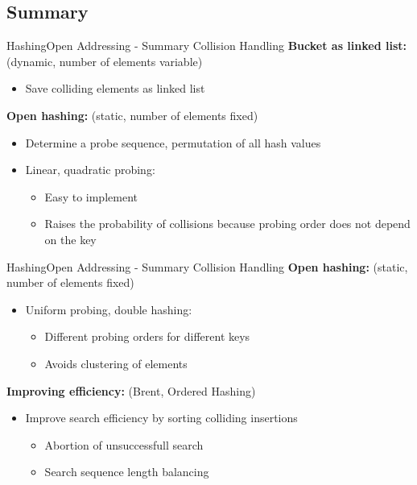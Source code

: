 
\subsection{Summary}

\begin{frame}{Hashing}{Open Addressing - Summary Collision Handling}
  \textbf{Bucket as linked list:}
  {\color{MainA}(dynamic, number of elements variable)}
  \begin{itemize}
    \item
      Save colliding elements as linked list
  \end{itemize}
  \vspace{1.0em}
  \textbf{Open hashing:}
  {\color{MainA}(static, number of elements fixed)}
  \begin{itemize}
    \item
      Determine a probe sequence, permutation of all hash values
    \item
      Linear, quadratic probing:
      \begin{itemize}
        \item
          Easy to implement
        \item
          Raises the probability of collisions because probing order does
          not depend on the key
      \end{itemize}
  \end{itemize}
\end{frame}


\begin{frame}{Hashing}{Open Addressing - Summary Collision Handling}
  \textbf{Open hashing:}
         {\color{MainA}(static, number of elements fixed)}
  \begin{itemize}
    \item
      Uniform probing, double hashing:
      \begin{itemize}
        \item
          Different probing orders for different keys
        \item
          Avoids clustering of elements
      \end{itemize}
  \end{itemize}
  \vspace{1.0em}
  \textbf{Improving efficiency:}
  {\color{MainA}(Brent, Ordered Hashing)}
  \begin{itemize}
    \item
      Improve search efficiency by sorting colliding insertions
      \begin{itemize}
        \item
          Abortion of unsuccessfull search
        \item
          Search sequence length balancing
      \end{itemize}
  \end{itemize}
\end{frame}

